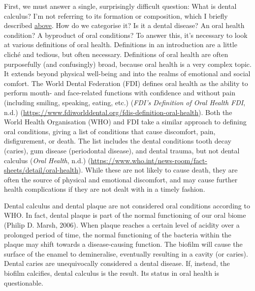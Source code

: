 \documentclass[
  letterpaper,
]{book}
\begin{document}
First, we must answer a single, surprisingly difficult question: What is
dental calculus? I'm not referring to its formation or composition,
which I briefly described \protect\hyperlink{intro}{above}. How do we
categorise it? Is it a dental disease? An oral health condition? A
byproduct of oral conditions? To answer this, it's necessary to look at
various definitions of oral health. Definitions in an introduction are a
little cliché and tedious, but often necessary. Definitions of oral
health are often purposefully (and confusingly) broad, because oral
health is a very complex topic. It extends beyond physical well-being
and into the realms of emotional and social comfort. The World Dental
Federation (FDI) defines oral health as the ability to perform mouth-
and face-related functions with confidence and without pain (including
smiling, speaking, eating, etc.) (\emph{{FDI}'s Definition of Oral
Health \textbar{} {FDI}}, n.d.)
(\url{https://www.fdiworlddental.org/fdis-definition-oral-health}). Both
the World Health Organisation (WHO) and FDI take a similar approach to
defining oral conditions, giving a list of conditions that cause
discomfort, pain, disfigurement, or death. The list includes the dental
conditions tooth decay (caries), gum disease (periodontal disease), and
dental trauma, but not dental calculus (\emph{Oral Health}, n.d.)
(\url{https://www.who.int/news-room/fact-sheets/detail/oral-health}).
While these are not likely to cause death, they are often the source of
physical and emotional discomfort, and may cause further health
complications if they are not dealt with in a timely fashion.

Dental calculus and dental plaque are not considered oral conditions
according to WHO. In fact, dental plaque is part of the normal
functioning of our oral biome (Philip D. Marsh, 2006). When plaque
reaches a certain level of acidity over a prolonged period of time, the
normal functioning of the bacteria within the plaque may shift towards a
disease-causing function. The biofilm will cause the surface of the
enamel to demineralise, eventually resulting in a cavity (or caries).
Dental caries are unequivocally considered a dental disease. If,
instead, the biofilm calcifies, dental calculus is the result. Its
status in oral health is questionable.
\end{document}
